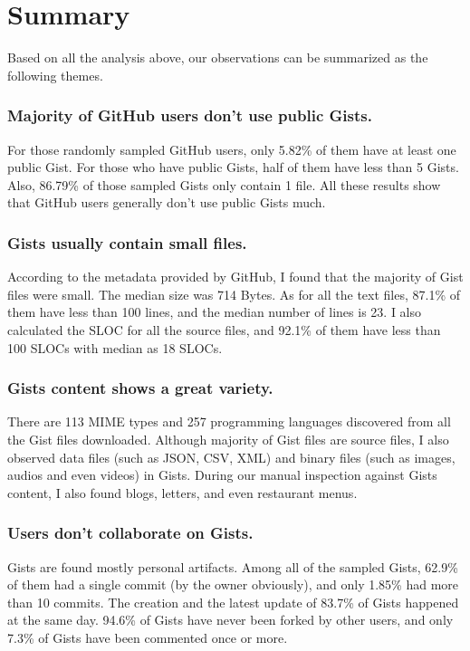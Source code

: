 \section{Summary}

Based on all the analysis above, our observations can be summarized as the following themes.

\subsubsection{Majority of GitHub users don't use public Gists.}

For those randomly sampled GitHub users, only 5.82\% of them have at least one public Gist. For those who have public Gists, half of them have less than 5 Gists. Also, 86.79\% of those sampled Gists only contain 1 file. All these results show that GitHub users generally don't use public Gists much. 

\subsubsection{Gists usually contain small files.}

According to the metadata provided by GitHub, I found that the majority of Gist files were small. The median size was 714 Bytes. As for all the text files, 87.1\% of them have less than 100 lines, and the median number of lines is 23. I also calculated the SLOC for all the source files, and 92.1\% of them have less than 100 SLOCs with median as 18 SLOCs. 

\subsubsection{Gists content shows a great variety.}

There are 113 MIME types and 257 programming languages discovered from all the Gist files downloaded. Although majority of Gist files are source files, I also observed data files (such as JSON, CSV, XML) and binary files (such as images, audios and even videos) in Gists. During our manual inspection against Gists content, I also found blogs, letters, and even restaurant menus. 

\subsubsection{Users don't collaborate on Gists.}
Gists are found mostly personal artifacts. Among all of the sampled Gists, 62.9\% of them had a single commit (by the owner obviously), and only 1.85\% had more than 10 commits. The creation and the latest update of 83.7\% of Gists happened at the same day. 94.6\% of Gists have never been forked by other users, and only 7.3\% of Gists have been commented once or more. 

